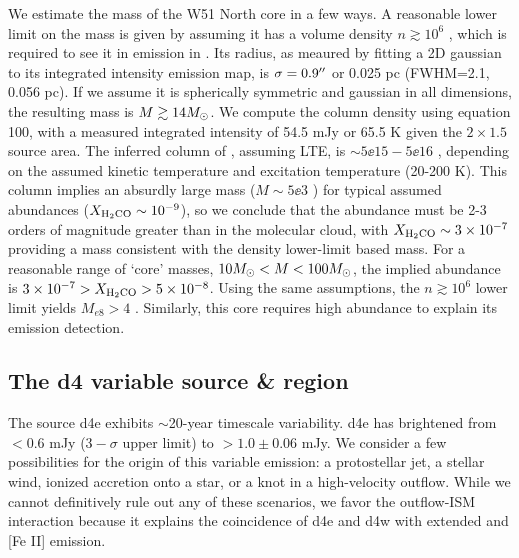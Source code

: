 We estimate the mass of the W51 North core in a few ways.  A reasonable lower limit
on the mass is given by assuming it has a volume density $n\gtrsim10^6$ \percc,
which is required to see it in emission in \ortho \twotwo.  Its radius, as
meaured by fitting a 2D gaussian to its integrated intensity emission map, is
$\sigma=0.9\mbox{$^{\prime\prime}$}$ or 0.025 pc (FWHM=2.1\arcsec, 0.056 pc).  If we assume it
is spherically symmetric and gaussian in
all dimensions, the resulting mass is $M\gtrsim14M_{\odot}$.
We compute the \ortho \twotwo column density using \citet{Mangum2015a} equation
100, with a measured integrated intensity of 54.5 mJy \kms or 65.5 K \kms given
the $2\times1.5$\arcsec source area.  The inferred column of \ortho,
assuming LTE, is $\sim5\ee{15} - 5\ee{16}$ \persc, depending on the assumed
kinetic temperature and excitation temperature (20-200 K).  This \formaldehyde column
implies an absurdly large mass ($M\sim5\ee{3}$ \msun) for typical assumed abundances
($X_{\textrm{H}_2\textrm{CO}}\sim10^{-9}$), so we conclude that the \formaldehyde abundance
must be 2-3 orders of magnitude greater than in the molecular cloud, with
$X_{\textrm{H}_2\textrm{CO}}\sim3\times10^{-7}$ providing a mass consistent with the density
lower-limit based mass.  For a reasonable range of `core' masses, $10
M_{\odot}<M<100 M_{\odot}$, the implied abundance is $3\times10^{-7} > X_{\textrm{H}_2\textrm{CO}} >
5\times10^{-8}$.
Using the same assumptions, the $n\gtrsim10^6$ \percc lower limit yields
$M_{e8}>4$ \msun.  Similarly, this core requires high abundance to explain its
emission detection.





\subsection{The d4 variable source \& \hh region}
\label{sec:d4}
The source d4e exhibits $\sim$20-year timescale variability.  d4e has
brightened from $<0.6$ mJy ($3-\sigma$ upper limit) to $>1.0\pm0.06$ mJy.  We
consider a few possibilities for the origin of this variable emission: a
protostellar jet,  a stellar wind, ionized accretion onto a star, or a knot in
a high-velocity outflow.  While we cannot definitively rule out any of these
scenarios, we favor the outflow-ISM interaction because it explains the
coincidence of d4e and d4w with extended \hh and [Fe II] emission.

